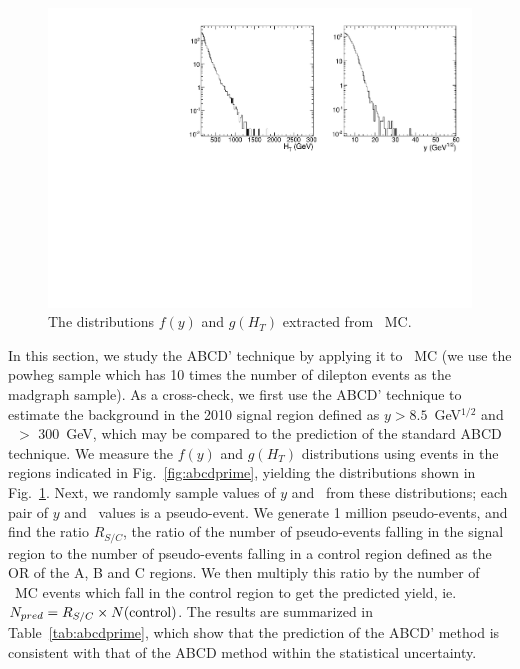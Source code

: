 \begin{figure}[tbh]
\begin{center}
\includegraphics[width=1\linewidth]{plots/abcdprimedist.pdf}
\caption{\label{fig:abcddist}\protect The distributions $f(y)$ and $g(H_T)$ 
extracted from \ttbar\ MC.}
\end{center}
\end{figure}

In this section, we study the ABCD' technique by applying it to \ttbar\ MC (we use the powheg sample which has
10 times the number of dilepton events as the madgraph sample). As a cross-check,
we first use the ABCD' technique to estimate the background in the 2010 signal region
defined as $y > 8.5$~GeV$^{1/2}$ and \Ht\ $>$ 300~GeV, which may be compared to the 
prediction of the standard ABCD technique. We measure the $f(y)$ and $g(H_T)$ distributions
using events in the regions indicated in Fig.~\ref{fig:abcdprime}, yielding the
distributions shown in Fig.~\ref{fig:abcddist}. Next, we randomly sample values of $y$
and \Ht\ from these distributions; each pair of $y$ and \Ht\ values is a pseudo-event.
We generate 1 million pseudo-events, and find the ratio $R_{S/C}$, the ratio of the
number of pseudo-events falling in the signal region to the number of pseudo-events
falling in a control region defined as the OR of the A, B and C regions. We then
multiply this ratio by the number of \ttbar\ MC events which fall in the control region
to get the predicted yield, ie. $N_{pred} = R_{S/C} \times N({\rm control})$. The results
are summarized in Table~\ref{tab:abcdprime}, which show that the prediction of the
ABCD' method is consistent with that of the ABCD method within the statistical uncertainty.

